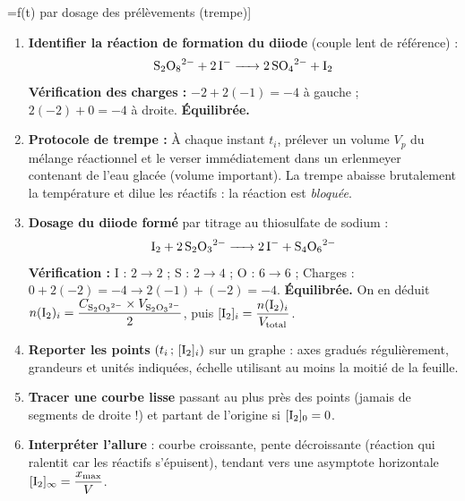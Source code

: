 \documentclass[11pt]{article}
\newcommand{\cle}[1]{{\popxbold\color{popdark}#1}}
\begin{document}
\begin{methode}[Construire la courbe [I2]=f(t) par dosage des prélèvements (trempe)]
\begin{enumerate}
\item \textbf{Identifier la réaction de formation du diiode} (couple lent de référence) :
      \[ \ce{S2O8^2- + 2 I- -> 2 SO4^2- + I2} \]
      \textbf{Vérification des charges :} $-2 + 2(-1) = -4$ à gauche ; $2(-2) + 0 = -4$ à droite. \textbf{Équilibrée.}
\item \textbf{Protocole de trempe :} À chaque instant $t_i$, prélever un volume $V_p$ du mélange réactionnel et le verser immédiatement dans un erlenmeyer contenant de l'eau glacée (volume important). La \cle{trempe} abaisse brutalement la température et dilue les réactifs : la réaction est \emph{bloquée}.
\item \textbf{Dosage du diiode formé} par titrage au thiosulfate de sodium :
      \[ \ce{I2 + 2 S2O3^2- -> 2 I- + S4O6^2-} \]
      \textbf{Vérification :} I : $2 \to 2$ ; S : $2 \to 4$ ; O : $6 \to 6$ ; Charges : $0 + 2(-2) = -4 \to 2(-1) + (-2) = -4$. \textbf{Équilibrée.}
      On en déduit $n(\ce{I2})_i = \dfrac{C_{\ce{S2O3^2-}} \times V_{\ce{S2O3^2-}}}{2}$, puis $[\ce{I2}]_i = \dfrac{n(\ce{I2})_i}{V_{\text{total}}}$.
\item \textbf{Reporter les points} $(t_i\,;\,[\ce{I2}]_i)$ sur un graphe : axes gradués régulièrement, grandeurs et unités indiquées, échelle utilisant au moins la moitié de la feuille.
\item \textbf{Tracer une courbe lisse} passant au plus près des points (jamais de segments de droite !) et partant de l'origine si $[\ce{I2}]_0 = 0$.
\item \textbf{Interpréter l'allure} : courbe croissante, pente décroissante (réaction qui ralentit car les réactifs s'épuisent), tendant vers une asymptote horizontale $[\ce{I2}]_{\infty} = \dfrac{x_{\max}}{V}$.
\end{enumerate}
\end{methode}
\end{document}
